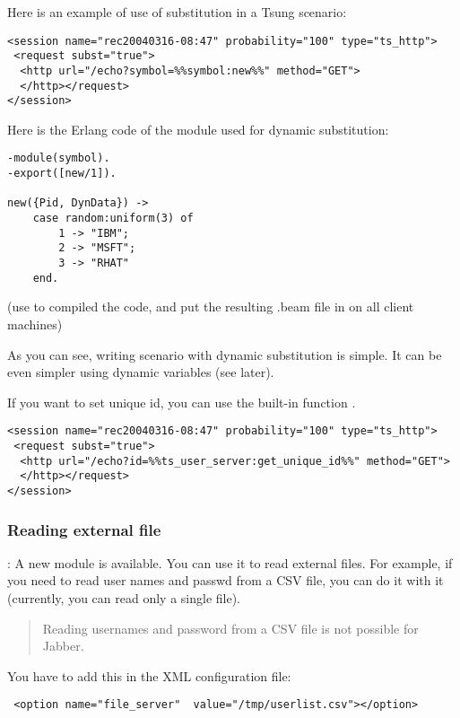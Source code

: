 \documentclass{TSUNG-en}
\begin{document}
Here is an example of use of substitution in a Tsung scenario:

\begin{Verbatim}
<session name="rec20040316-08:47" probability="100" type="ts_http">
 <request subst="true">
  <http url="/echo?symbol=%%symbol:new%%" method="GET">
  </http></request>
</session>
\end{Verbatim}

Here is the Erlang code of the module used for dynamic substitution:

\begin{Verbatim}
-module(symbol).
-export([new/1]).

new({Pid, DynData}) ->
    case random:uniform(3) of
        1 -> "IBM";
        2 -> "MSFT";
        3 -> "RHAT"
    end.
\end{Verbatim}

(use  to compiled the code, and put the resulting .beam
file in  on all client
machines)

As you can see, writing scenario with dynamic substitution is
simple. It can be even simpler using dynamic variables (see later).

If you want to set unique id, you can use the built-in function
.
\begin{Verbatim}
<session name="rec20040316-08:47" probability="100" type="ts_http">
 <request subst="true">
  <http url="/echo?id=%%ts_user_server:get_unique_id%%" method="GET">
  </http></request>
</session>
\end{Verbatim}

\subsubsection{Reading external file}
: A new  module  is available. You
can use it to read external files. For example, if you need to read user
names and passwd from a CSV file, you can do it with it (currently,
you can read only a single file).

\begin{quote}
  Reading usernames and password from a CSV file is not possible for Jabber.
\end{quote}

You have to add this in the XML configuration file:
\begin{Verbatim}
 <option name="file_server"  value="/tmp/userlist.csv"></option>
\end{Verbatim}
\end{document}
